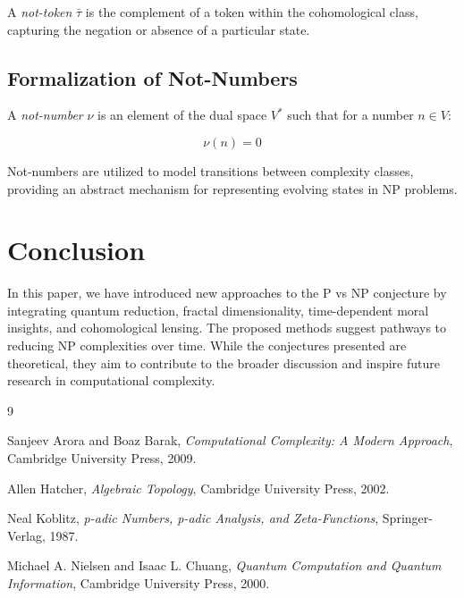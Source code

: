 \documentclass{article}
\begin{document}
\begin{definition}
A \textit{not-token} \( \bar{\tau} \) is the complement of a token within the cohomological class, capturing the negation or absence of a particular state.
\end{definition}

\subsection{Formalization of Not-Numbers}

\begin{definition}
A \textit{not-number} \( \nu \) is an element of the dual space \( V^* \) such that for a number \( n \in V \):

\[
\nu(n) = 0
\]
\end{definition}

Not-numbers are utilized to model transitions between complexity classes, providing an abstract mechanism for representing evolving states in NP problems.

\section{Conclusion}

In this paper, we have introduced new approaches to the P vs NP conjecture by integrating quantum reduction, fractal dimensionality, time-dependent moral insights, and cohomological lensing. The proposed methods suggest pathways to reducing NP complexities over time. While the conjectures presented are theoretical, they aim to contribute to the broader discussion and inspire future research in computational complexity.

\begin{thebibliography}{9}

Sanjeev Arora and Boaz Barak,
\textit{Computational Complexity: A Modern Approach},
Cambridge University Press, 2009.

Allen Hatcher,
\textit{Algebraic Topology},
Cambridge University Press, 2002.

Neal Koblitz,
\textit{p-adic Numbers, p-adic Analysis, and Zeta-Functions},
Springer-Verlag, 1987.

Michael A. Nielsen and Isaac L. Chuang,
\textit{Quantum Computation and Quantum Information},
Cambridge University Press, 2000.

\end{thebibliography}
\end{document}
